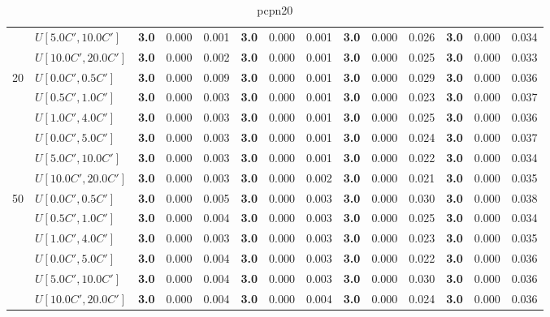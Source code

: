 \begin{table}[h]
{\begin{tabular}{|l|l||l|l|l||l|l|l||l|l|l||l|l|l|}
       & $U[5.0C',10.0C']$ & \textbf{3.0} & 0.000 & 0.001 & \textbf{3.0} & 0.000 & 0.001 & \textbf{3.0} & 0.000 & 0.026 & \textbf{3.0} & 0.000 & 0.034 \\
       & $U[10.0C',20.0C']$ & \textbf{3.0} & 0.000 & 0.002 & \textbf{3.0} & 0.000 & 0.001 & \textbf{3.0} & 0.000 & 0.025 & \textbf{3.0} & 0.000 & 0.033 \\
      \hline\hline
      \multirow{6}{*}{20} & $U[0.0C',0.5C']$ & \textbf{3.0} & 0.000 & 0.009 & \textbf{3.0} & 0.000 & 0.001 & \textbf{3.0} & 0.000 & 0.029 & \textbf{3.0} & 0.000 & 0.036 \\
       & $U[0.5C',1.0C']$ & \textbf{3.0} & 0.000 & 0.003 & \textbf{3.0} & 0.000 & 0.001 & \textbf{3.0} & 0.000 & 0.023 & \textbf{3.0} & 0.000 & 0.037 \\
       & $U[1.0C',4.0C']$ & \textbf{3.0} & 0.000 & 0.003 & \textbf{3.0} & 0.000 & 0.001 & \textbf{3.0} & 0.000 & 0.025 & \textbf{3.0} & 0.000 & 0.036 \\
       & $U[0.0C',5.0C']$ & \textbf{3.0} & 0.000 & 0.003 & \textbf{3.0} & 0.000 & 0.001 & \textbf{3.0} & 0.000 & 0.024 & \textbf{3.0} & 0.000 & 0.037 \\
       & $U[5.0C',10.0C']$ & \textbf{3.0} & 0.000 & 0.003 & \textbf{3.0} & 0.000 & 0.001 & \textbf{3.0} & 0.000 & 0.022 & \textbf{3.0} & 0.000 & 0.034 \\
       & $U[10.0C',20.0C']$ & \textbf{3.0} & 0.000 & 0.003 & \textbf{3.0} & 0.000 & 0.002 & \textbf{3.0} & 0.000 & 0.021 & \textbf{3.0} & 0.000 & 0.035 \\
      \hline\hline
      \multirow{6}{*}{50} & $U[0.0C',0.5C']$ & \textbf{3.0} & 0.000 & 0.005 & \textbf{3.0} & 0.000 & 0.003 & \textbf{3.0} & 0.000 & 0.030 & \textbf{3.0} & 0.000 & 0.038 \\
       & $U[0.5C',1.0C']$ & \textbf{3.0} & 0.000 & 0.004 & \textbf{3.0} & 0.000 & 0.003 & \textbf{3.0} & 0.000 & 0.025 & \textbf{3.0} & 0.000 & 0.034 \\
       & $U[1.0C',4.0C']$ & \textbf{3.0} & 0.000 & 0.003 & \textbf{3.0} & 0.000 & 0.003 & \textbf{3.0} & 0.000 & 0.023 & \textbf{3.0} & 0.000 & 0.035 \\
       & $U[0.0C',5.0C']$ & \textbf{3.0} & 0.000 & 0.004 & \textbf{3.0} & 0.000 & 0.003 & \textbf{3.0} & 0.000 & 0.022 & \textbf{3.0} & 0.000 & 0.036 \\
       & $U[5.0C',10.0C']$ & \textbf{3.0} & 0.000 & 0.004 & \textbf{3.0} & 0.000 & 0.003 & \textbf{3.0} & 0.000 & 0.030 & \textbf{3.0} & 0.000 & 0.036 \\
       & $U[10.0C',20.0C']$ & \textbf{3.0} & 0.000 & 0.004 & \textbf{3.0} & 0.000 & 0.004 & \textbf{3.0} & 0.000 & 0.024 & \textbf{3.0} & 0.000 & 0.036 \\
      \hline
      \end{tabular}
      }
      \caption{pcpn20}
      \label{tab:pcpn20}\end{table}


